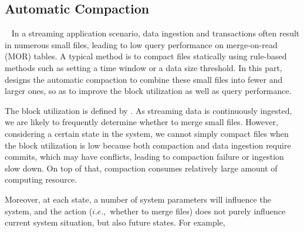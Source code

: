 




\subsection{Automatic Compaction}~\label{subsec:compaction}
In a streaming application scenario, data ingestion and transactions often result in numerous small files, leading to low query performance on merge-on-read (MOR) tables. 
A typical method is to compact files statically using rule-based methods such as setting a time window or a data size threshold.
In this part, \brain  designs the automatic compaction to combine these small files into fewer and larger ones, so as to  improve the block utilization  as well as query performance.

The block utilization is defined by .
 As streaming data is continuously  ingested,  we are likely to frequently determine whether to merge small files.
  However, considering a certain state in the system, we cannot simply  compact files when the block utilization is low because both compaction and data ingestion require commits, which may have conflicts, leading to compaction failure or ingestion slow down. On top of that, compaction consumes relatively large amount of computing resource. 
  
   Moreover,  at each state, a number of system parameters  will influence the system, and the action ($i.e.,$ whether to merge files) does not purely influence current system situation, but also future states. For example, 

